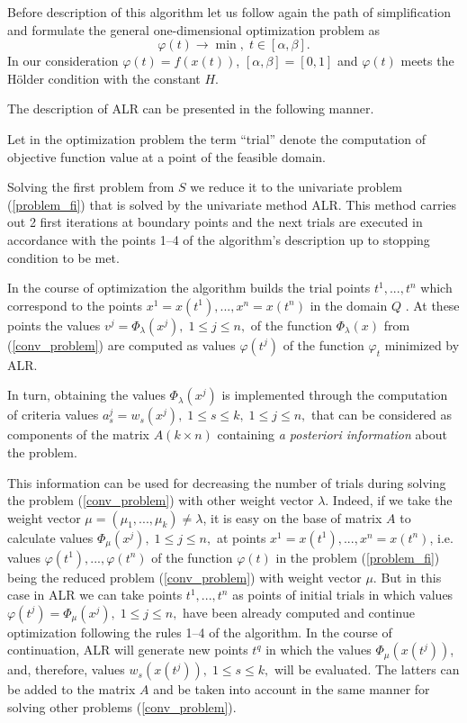 \documentclass[]{interact}
\theoremstyle{plain}%
\theoremstyle{definition}
\theoremstyle{remark}
\begin{document}
Before description of this algorithm let us follow again the path of simplification and formulate the general one-dimensional optimization problem as
\begin{equation}\label{problem_fi}
\varphi(t) \rightarrow \min, \; t \in [\alpha,\beta].
\end{equation}
In our consideration $\varphi(t) = f(x(t))$, $[\alpha,\beta] = [0,1]$ and $\varphi(t)$  meets the H{\"o}lder condition with the constant $H$.

The description of ALR can be presented in the following manner.

Let in the optimization problem the term ``trial'' denote the computation of objective function value at a point of the feasible domain. 



Solving the first problem from $S$ we reduce it to the univariate problem (\ref{problem_fi}) that is solved by the univariate method ALR. This method carries out 2 first iterations at boundary points and the next trials are executed in accordance with the points 1--4 of the algorithm's description up to stopping condition to be met.

In the course of optimization the algorithm builds the trial points $t^1,...,t^n$ which correspond to the points $x^1 = x(t^1),...,x^n=x(t^n)$ in the domain $Q$ . At these points the values $v^j = \Phi_\lambda(x^j), \; 1 \leq j \leq n,$ of the function $\Phi_\lambda(x)$ from (\ref{conv_problem}) are computed as values $\varphi(t^j)$ of the function $\varphi_t$  minimized by ALR.

In turn, obtaining the values $\Phi_\lambda(x^j)$  is implemented through the computation of criteria values $a_s^j = w_s(x^j), \; 1 \leq s \leq k, \; 1 \leq j \leq n,$  that can be considered as components of the matrix $A(k \times n)$ containing \textit{a posteriori information} about the problem.

This information can be used for decreasing the number of trials during solving the problem (\ref{conv_problem}) with other weight vector $\lambda$. Indeed, if we take the weight vector $\mu = (\mu_1,...,\mu_k) \neq \lambda$, it is easy on the base of matrix $A$ to calculate values $\Phi_\mu(x^j), \; 1 \leq j \leq n,$ at points $x^1 = x(t^1),...,x^n=x(t^n)$, i.e. values $\varphi(t^1),...,\varphi(t^n)$ of the function $\varphi(t)$ in the problem (\ref{problem_fi}) being the reduced problem (\ref{conv_problem}) with weight vector $\mu$. But in this case in ALR we can take points $t^1,...,t^n$ as points of initial trials in which values $ \varphi(t^j) = \Phi_\mu(x^j), \; 1 \leq j \leq n,$ have been already computed and continue optimization following the rules 1--4 of the algorithm. In the course of continuation, ALR will generate new points $t^q$ in which the values $\Phi_\mu(x(t^j))$, and, therefore, values $w_s(x(t^j)), \; 1 \leq s \leq k,$ will be evaluated. The latters can be added to the matrix $A$ and be taken into account in the same manner for solving other problems (\ref{conv_problem}). 
\end{document}
